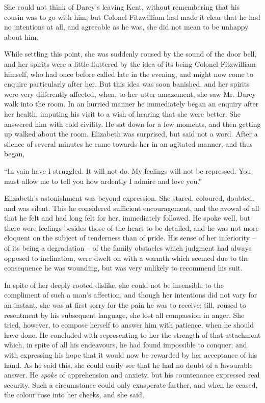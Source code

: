 She could not think of Darcy’s leaving Kent, without
remembering that his cousin was to go with him; but
Colonel Fitzwilliam had made it clear that he had no
intentions at all, and agreeable as he was, she did not
mean to be unhappy about him.

While settling this point, she was suddenly roused by
the sound of the door bell, and her spirits were a little
fluttered by the idea of its being Colonel Fitzwilliam
himself, who had once before called late in the evening,
and might now come to enquire particularly after her.
But this idea was soon banished, and her spirits were
very differently affected, when, to her utter amazement,
she saw Mr. Darcy walk into the room. In an hurried
manner he immediately began an enquiry after her health,
imputing his visit to a wish of hearing that she were
better. She answered him with cold civility. He sat
down for a few moments, and then getting up walked
about the room. Elizabeth was surprised, but said not
a word. After a silence of several minutes he came
towards her in an agitated manner, and thus began,

“In vain have I struggled. It will not do. My feelings
will not be repressed. You must allow me to tell you
how ardently I admire and love you.”

Elizabeth’s astonishment was beyond expression. She
stared, coloured, doubted, and was silent. This he considered
sufficient encouragement, and the avowal of all
that he felt and had long felt for her, immediately followed.
He spoke well, but there were feelings besides those of the
heart to be detailed, and he was not more eloquent on the
subject of tenderness than of pride. His sense of her
inferiority -- of its being a degradation -- of the family
obstacles which judgment had always opposed to inclination,
were dwelt on with a warmth which seemed due
to the consequence he was wounding, but was very unlikely
to recommend his suit.

In spite of her deeply-rooted dislike, she could not be
insensible to the compliment of such a man’s affection,
and though her intentions did not vary for an instant,
she was at first sorry for the pain he was to receive; till,
roused to resentment by his subsequent language, she lost
all compassion in anger. She tried, however, to compose
herself to answer him with patience, when he should have
done. He concluded with representing to her the strength
of that attachment which, in spite of all his endeavours,
he had found impossible to conquer; and with expressing
his hope that it would now be rewarded by her acceptance
of his hand. As he said this, she could easily see that he
had no doubt of a favourable answer. He \textit{spoke} of apprehension
and anxiety, but his countenance expressed real
security. Such a circumstance could only exasperate
farther, and when he ceased, the colour rose into her cheeks,
and she said,

